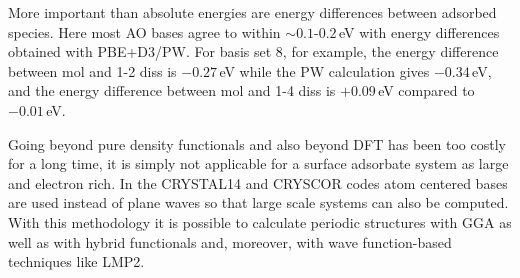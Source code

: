 \documentclass[11pt,DIV=13,BCOR=5mm,a4paper,headinclude]{scrbook}
\begin{document}
More important than absolute energies are energy differences between adsorbed species.
Here most AO bases agree to within $\sim 0.1$-$0.2\,$eV with energy differences obtained with PBE+D3/PW.
For basis set 8, for example, the energy difference between mol and 1-2 diss is $-0.27\,$eV while the PW calculation gives $-0.34\,$eV, and the energy difference between mol and 1-4 diss is $+0.09\,$eV compared to $-0.01\,$eV.

Going beyond pure density functionals and also beyond DFT has been too costly for a long time, it is simply not applicable for a surface adsorbate system as large and electron rich.
In the CRYSTAL14\cite{crystal14} and CRYSCOR\cite{cryscor} codes atom centered bases are used instead of plane waves so that large scale systems can also be computed.
With this methodology it is possible to calculate periodic structures with GGA as well as with hybrid functionals and, moreover, with wave function-based techniques like LMP2.
\end{document}
